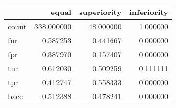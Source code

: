 \begin{tabular}{lrrr}
\toprule
{} &       equal &  superiority &  inferiority \\
\midrule
count &  338.000000 &    48.000000 &     1.000000 \\
fnr   &    0.587253 &     0.441667 &     0.000000 \\
fpr   &    0.387970 &     0.157407 &     0.000000 \\
tnr   &    0.612030 &     0.509259 &     0.111111 \\
tpr   &    0.412747 &     0.558333 &     0.000000 \\
bacc  &    0.512388 &     0.478241 &     0.000000 \\
\bottomrule
\end{tabular}
